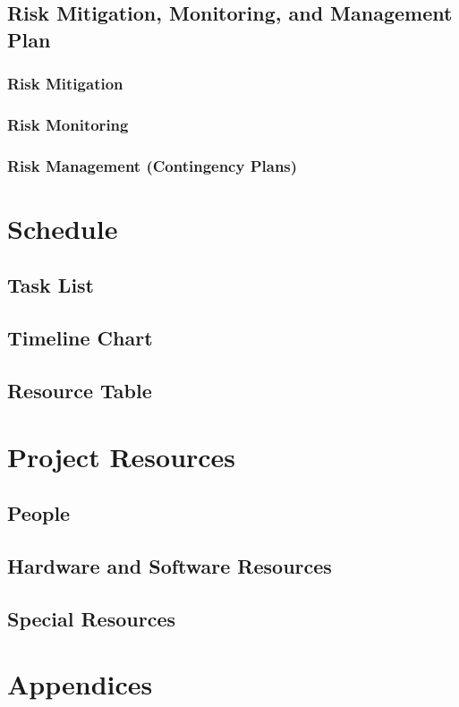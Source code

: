 \documentclass[english,12pt]{article}
\begin{document}
\subsection{Risk Mitigation, Monitoring, and Management Plan}

\subsubsection{Risk Mitigation}

\subsubsection{Risk Monitoring}

\subsubsection{Risk Management (Contingency Plans)}

\section{Schedule}

\subsection{Task List}

\subsection{Timeline Chart}

\subsection{Resource Table}

\section{Project Resources}

\subsection{People}

\subsection{Hardware and Software Resources}

\subsection{Special Resources}

\section{Appendices}
\end{document}
